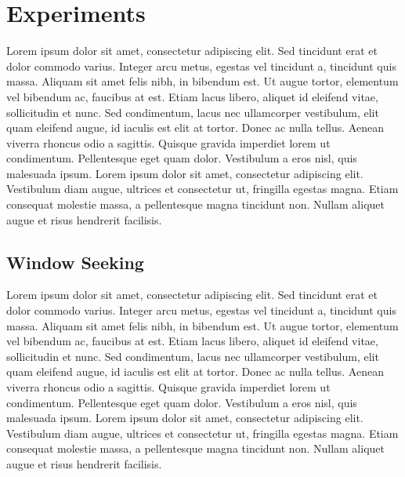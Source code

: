 \documentclass[letterpaper, 10 pt, conference]{ieeeconf}
\begin{document}
\section{Experiments}
Lorem ipsum dolor sit amet, consectetur adipiscing elit. Sed tincidunt erat et dolor commodo varius. Integer arcu metus, egestas vel tincidunt a, tincidunt quis massa. Aliquam sit amet felis nibh, in bibendum est. Ut augue tortor, elementum vel bibendum ac, faucibus at est. Etiam lacus libero, aliquet id eleifend vitae, sollicitudin et nunc. Sed condimentum, lacus nec ullamcorper vestibulum, elit quam eleifend augue, id iaculis est elit at tortor. Donec ac nulla tellus. Aenean viverra rhoncus odio a sagittis. Quisque gravida imperdiet lorem ut condimentum. Pellentesque eget quam dolor. Vestibulum a eros nisl, quis malesuada ipsum. Lorem ipsum dolor sit amet, consectetur adipiscing elit. Vestibulum diam augue, ultrices et consectetur ut, fringilla egestas magna. Etiam consequat molestie massa, a pellentesque magna tincidunt non. Nullam aliquet augue et risus hendrerit facilisis.

\subsection{Window Seeking}
Lorem ipsum dolor sit amet, consectetur adipiscing elit. Sed tincidunt erat et dolor commodo varius. Integer arcu metus, egestas vel tincidunt a, tincidunt quis massa. Aliquam sit amet felis nibh, in bibendum est. Ut augue tortor, elementum vel bibendum ac, faucibus at est. Etiam lacus libero, aliquet id eleifend vitae, sollicitudin et nunc. Sed condimentum, lacus nec ullamcorper vestibulum, elit quam eleifend augue, id iaculis est elit at tortor. Donec ac nulla tellus. Aenean viverra rhoncus odio a sagittis. Quisque gravida imperdiet lorem ut condimentum. Pellentesque eget quam dolor. Vestibulum a eros nisl, quis malesuada ipsum. Lorem ipsum dolor sit amet, consectetur adipiscing elit. Vestibulum diam augue, ultrices et consectetur ut, fringilla egestas magna. Etiam consequat molestie massa, a pellentesque magna tincidunt non. Nullam aliquet augue et risus hendrerit facilisis.

\end{document}
